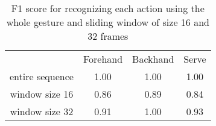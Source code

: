 \begin{table}[h]
\begin{tabular}{cccc}
                                        & \cellcolor[HTML]{C0C0C0}Forehand & \cellcolor[HTML]{C0C0C0}Backhand & \cellcolor[HTML]{C0C0C0}Serve \\
\cellcolor[HTML]{C0C0C0}entire sequence & 1.00                             & 1.00                             & 1.00                          \\
\cellcolor[HTML]{C0C0C0}window size 16  & 0.86                             & 0.89                             & 0.84                          \\
\cellcolor[HTML]{C0C0C0}window size 32  & 0.91                             & 1.00                             & 0.93                         
\end{tabular}
\caption{F1 score for recognizing each action using the whole gesture and sliding window of size 16 and 32 frames}
\label{table-score}
\end{table}